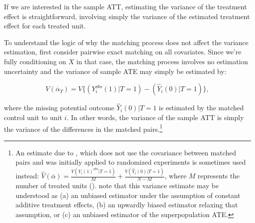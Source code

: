 \documentclass[11pt,titlepage]{article}
\begin{document}
If we are interested in the sample ATT, estimating the variance
of the treatment effect is straightforward, involving simply the
variance of the estimated treatment effect for each treated unit. 

\begin{comment}
Liz: I don't understand this.  How is it "simple", 
since we don't observe the estimated treatment effect for each treated unit, nevermind the individual variances.  
Maybe replace by something like "involving simply the variance of the potential outcomes under treatment and under 
control."  (which is true for the Neyman estimate).

Dan: Estimated treatment effect here refers to the pair difference,
each of which estimates $\alpha_i$.  If we adopt the Neyman estimates
via the discussion below, we should certainly also adopt your language here.
\end{comment}

To understand the logic of why the matching process does not affect the
variance estimation, first consider pairwise exact matching
on all covariates.  Since we're fully conditioning on $X$ in that
case, the matching process involves no estimation uncertainty 
and the variance of sample ATE may simply be estimated by:

\begin{equation} \label{VarATT}
V( \overline{\alpha}_T) = V \bigl\{ ( Y_i^{obs}(1) | T=1) -
  ( \hat{Y}_i(0) | T=1 )  \bigl\},
\end{equation} 

\noindent where the missing potential outcome $\hat{Y}_i(0) | T=1$ is estimated by the
matched control unit to unit $i$.  In other words, the variance of the
sample ATT is simply the variance of the differences in the matched
pairs.\footnote{An estimate due to \cite{Neyman23}, which 
does not use the
  covariance between matched pairs and was initially applied to randomized
  experiments is sometimes used instead: $\hat{V}(\overline{\alpha}) =
  \frac{V(Y_i(1)^{obs} | T=1)}{M} + \frac{V(\hat{Y}_i(0) |
    T=1)}{N-M}$, where $M$ represents the number of treated
  units (\citealt[Chapter 6]{ImbRubND}). \label{neyman}
  \citet{ImbRubND} note that this variance estimate may be
  understood as (a) an unbiased estimator under the assumption of
  constant additive treatment effects, (b) an upwardly biased
  estimator relaxing that assumption, or (c) an unbiased estimator of
  the superpopulation ATE.}
\end{document}
